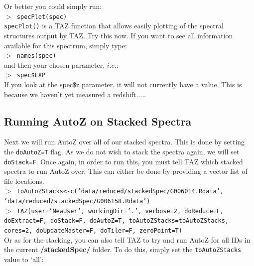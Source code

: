 \documentclass[12pt]{article}
\begin{document}
Or better you could simply run:\\

\hspace{10mm} \texttt{$>$ specPlot(spec)}\\

\texttt{specPlot()} is a TAZ function that allows easily plotting of the spectral structures output by TAZ. Try this now. If you want to see all information available for this spectrum, simply type:\\

 \hspace{10mm} \texttt{$>$ names(spec)} \\
 
 and then your chosen parameter, $i.e.$:\\
 
 
  \hspace{10mm} \texttt{$>$ spec\$EXP} \\
  
 If you look at the spec\$z parameter, it will not currently have a value. This is because we haven't yet measured a redshift.....
 

 \subsection{Running AutoZ on Stacked Spectra}
 
 Next we will run AutoZ over all of our stacked spectra. This is done by setting the \texttt{doAutoZ=T} flag. As we do not wish to stack the spectra again, we will set \texttt{doStack=F}. Once again, in order to run this, you must tell TAZ which stacked spectra to run AutoZ over. This can either be done by providing a vector list of file locations. \\
 
 \hspace{10mm} \texttt{$>$ toAutoZStacks<-c(`data/reduced/stackedSpec/G006014.Rdata',  \\ 'data/reduced/stackedSpec/G006158.Rdata')}\\
 
 \hspace{10mm} \texttt{$>$ TAZ(user='NewUser', workingDir='.', verbose=2, doReduce=F, doExtract=F, doStack=F,  doAutoZ=T, toAutoZStacks=toAutoZStacks, cores=2, doUpdateMaster=F, doTiler=F, zeroPoint=T)}\\ 
 
Or as for the stacking, you can also tell TAZ to try and run AutoZ for all IDs in the current \textbf{/stackedSpec/} folder. To do this, simply set the \texttt{toAutoZStacks} value to `all': \\
  
\end{document}
